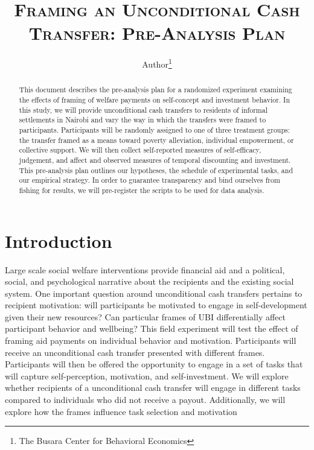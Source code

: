 \documentclass[11pt, a4paper]{article}\usepackage[]{graphicx}\usepackage[]{color}
\begin{document}
\title{\textsc{Framing an Unconditional Cash Transfer: Pre-Analysis Plan}}
\author{Author\footnote{The Busara Center for Behavioral Economics}}

\maketitle

\begin{abstract}

    This document describes the pre-analysis plan for a randomized experiment examining the effects of framing of welfare payments on self-concept and investment behavior. In this study, we will provide unconditional cash transfers to residents of informal settlements in Nairobi and vary the way in which the transfers were framed to participants. Participants will be randomly assigned to one of three treatment groups: the transfer framed as a means toward poverty alleviation, individual empowerment, or collective support. We will then collect self-reported measures of self-efficacy, judgement, and affect and observed measures of temporal discounting and investment. This pre-analysis plan outlines our hypotheses, the schedule of experimental tasks, and our empirical strategy. In order to guarantee transparency and bind ourselves from fishing for results, we will pre-register the scripts to be used for data analysis.

\end{abstract}

\newpage

\tableofcontents

\newpage

\section{Introduction}

    Large scale social welfare interventions provide financial aid and a political, social, and psychological narrative about the recipients and the existing social system. One important question around unconditional cash transfers pertains to recipient motivation: will participants be motivated to engage in self-development given their new resources? Can particular frames of UBI differentially affect participant behavior and wellbeing? This field experiment will test the effect of framing aid payments on individual behavior and motivation. Participants will receive an unconditional cash transfer presented with different frames. Participants will then be offered the opportunity to engage in a set of tasks that will capture self-perception, motivation, and self-investment. We will explore whether recipients of a unconditional cash transfer will engage in different tasks compared to individuals who did not receive a payout. Additionally, we will explore how the frames influence task selection and motivation
\end{document}

